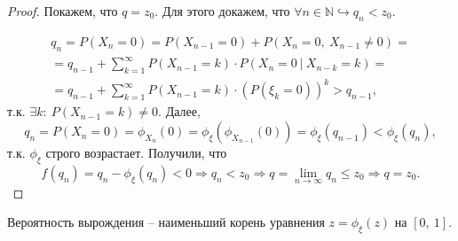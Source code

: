 \begin{proof}
Покажем, что $\displaystyle q=z_{0}$. Для этого докажем, что $\displaystyle \forall n\in \mathbb{N} \hookrightarrow q_{n} < z_{0}$.

\begin{gather*}
q_{n} =P( X_{n} =0) =P( X_{n-1} =0) +P( X_{n} =0,\ X_{n-1} \neq 0) =\\
=q_{n-1} +\sum _{k=1}^{\infty } P( X_{n-1} =k) \cdotp P( X_{n} =0\ |\ X_{n-k} =k) =\\
=q_{n-1} +\sum _{k=1}^{\infty } P( X_{n-1} =k) \cdotp ( P( \xi _{k} =0))^{k}  >q_{n-1} ,
\end{gather*}
т.к. $\displaystyle \exists k:\ P( X_{n-1} =k) \neq 0$. Далее,
\begin{equation*}
q_{n} =P( X_{n} =0) =\phi _{X_{n}}( 0) =\phi _{\xi }( \phi _{X_{n-1}}( 0)) =\phi _{\xi }( q_{n-1}) < \phi _{\xi }( q_{n}) ,
\end{equation*}
т.к. $\displaystyle \phi _{\xi }$ строго возрастает. Получили, что
\begin{equation*}
f( q_{n}) =q_{n} -\phi _{\xi }( q_{n}) < 0\Rightarrow q_{n} < z_{0} \Rightarrow q=\lim _{n\rightarrow \infty } q_{n} \leqslant z_{0} \Rightarrow q=z_{0} .
\end{equation*}
\end{proof}
\begin{corollary}
Вероятность вырождения -- наименьший корень уравнения $\displaystyle z=\phi _{\xi }( z)$ на $\displaystyle [ 0,\ 1]$.
\end{corollary}